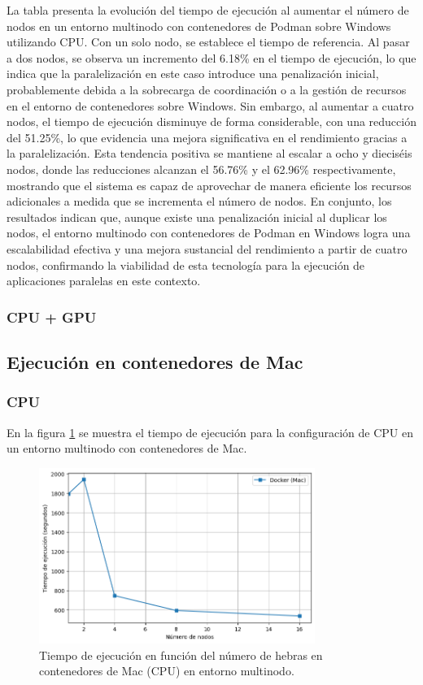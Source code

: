 La tabla presenta la evolución del tiempo de ejecución al aumentar el número de nodos en un entorno multinodo con contenedores de Podman sobre Windows utilizando CPU. Con un solo nodo, se establece el tiempo de referencia. Al pasar a dos nodos, se observa un incremento del 6.18\% en el tiempo de ejecución, lo que indica que la paralelización en este caso introduce una penalización inicial, probablemente debida a la sobrecarga de coordinación o a la gestión de recursos en el entorno de contenedores sobre Windows. Sin embargo, al aumentar a cuatro nodos, el tiempo de ejecución disminuye de forma considerable, con una reducción del 51.25\%, lo que evidencia una mejora significativa en el rendimiento gracias a la paralelización. Esta tendencia positiva se mantiene al escalar a ocho y dieciséis nodos, donde las reducciones alcanzan el 56.76\% y el 62.96\% respectivamente, mostrando que el sistema es capaz de aprovechar de manera eficiente los recursos adicionales a medida que se incrementa el número de nodos. En conjunto, los resultados indican que, aunque existe una penalización inicial al duplicar los nodos, el entorno multinodo con contenedores de Podman en Windows logra una escalabilidad efectiva y una mejora sustancial del rendimiento a partir de cuatro nodos, confirmando la viabilidad de esta tecnología para la ejecución de aplicaciones paralelas en este contexto.

\subsubsection{CPU + GPU}

\subsection{Ejecución en contenedores de Mac}
\subsubsection{CPU}

En la figura \ref{fig:multi-node_mac_docker_time} se muestra el tiempo de ejecución para la configuración de CPU en un entorno multinodo con contenedores de Mac.

\begin{figure}[H]
    \centering
    \includegraphics[width=0.8\textwidth]{imagenes/cap5/multi-node_mac_docker_time.png}
    \caption{Tiempo de ejecución en función del número de hebras en contenedores de Mac (CPU) en entorno multinodo.}
    \label{fig:multi-node_mac_docker_time}
\end{figure}

